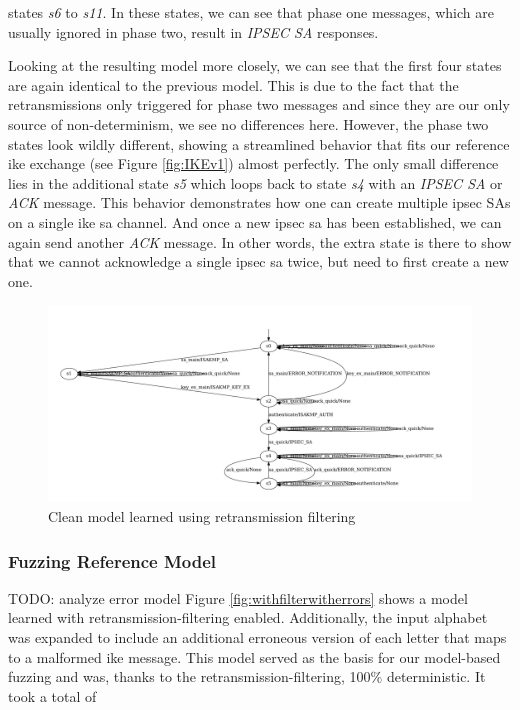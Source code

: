 states \emph{s6} to \emph{s11}. In these states, we can see that phase one messages, which are usually ignored in phase two, result in \emph{IPSEC SA} responses.

Looking at the resulting model more closely, we can see that the first four states are again identical to the previous model. This is due to the fact that the retransmissions only triggered for phase two messages and since they are our only source of non-determinism, we see no differences here. However, the phase two states look wildly different, showing a streamlined behavior that fits our reference \ac{ike} exchange (see Figure \ref{fig:IKEv1}) almost perfectly. The only small difference lies in the additional state \emph{s5} which loops back to state \emph{s4} with an \emph{IPSEC SA} or \emph{ACK} message. This behavior demonstrates how one can create multiple \ac{ipsec} SAs on a single \ac{ike} \ac{sa} channel. And once a new \ac{ipsec} \ac{sa} has been established, we can again send another \emph{ACK} message. In other words, the extra state is there to show that we cannot acknowledge a single \ac{ipsec} \ac{sa} twice, but need to first create a new one.

\begin{figure}[h]
	\centering
	\includegraphics[width=\linewidth]{images/models/Reference}
	\caption{Clean model learned using retransmission filtering}
	\label{fig:reference}
\end{figure} 

\newpage


\subsubsection*{Fuzzing Reference Model}
TODO: analyze error model
Figure \ref{fig:withfilterwitherrors} shows a model learned with retransmission-filtering enabled. Additionally, the input alphabet was expanded to include an additional erroneous version of each letter that maps to a malformed \ac{ike} message. This model served as the basis for our model-based fuzzing and was, thanks to the retransmission-filtering, 100\% deterministic. It took a total of 

